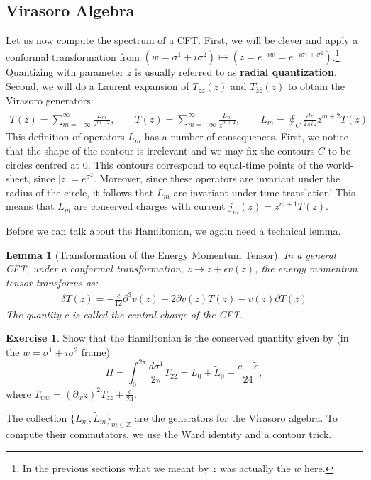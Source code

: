 \documentclass{report}
\theoremstyle{plain}
\newtheorem{lemma}[theorem]{Lemma}
\theoremstyle{definition}
\newtheorem{exercise}{Exercise}[section]
\theoremstyle{remark}
\newcommand{\FR}[2]{\frac{#1}{#2}}
\newcommand{\sg}{\sigma}
\newcommand{\di}{\partial}
\newcommand{\bZ}{\mathbb{Z}}
\begin{document}
\subsection{Virasoro Algebra}
Let us now compute the spectrum of a CFT. First, we will be clever and
apply a conformal transformation from $(w=\sg^1+i\sg^2)\mapsto
(z=e^{-iw}=e^{-i\sg^1+\sg^2})$.\footnote{In the previous sections what we
meant by $z$ was actually the $w$ here.} Quantizing with parameter $z$ is
usually referred to as \textbf{radial quantization}. Second, we will do a
Laurent expansion of $T_{zz}(z)$ and $T_{\bar z\bar z}(\bar z)$ to obtain
the Virasoro generators:
\begin{align}
    T(z) = \sum_{m=-\infty}^\infty \FR{L_m}{z^{m+2}}, \qquad
    \tilde T(z) = \sum_{m=-\infty}^\infty \FR{\tilde L_m}{\bar z^{m+2}}, \qquad
    L_m  = \oint_C \FR{dz}{2\pi iz} z^{m+2} T(z)
    \label{Virasorodefinition}
\end{align}
This definition of operators $L_m$ has a number of consequences. First, we
notice that the shape of the contour is irrelevant and we may fix the
contours $C$ to be circles centred at $0$. This contours correspond to
equal-time points of the world-sheet, since $|z| = e^{\sg^2}$. Moreover,
since these operators are invariant under the radius of the circle, it
follows that $L_m$ are invariant under time translation! This means that 
$L_m$ are conserved charges with current $j_m(z) = z^{m+1} T(z)$.

Before we can talk about the Hamiltonian, we again need a technical lemma.
\begin{lemma}[Transformation of the Energy Momentum Tensor] In a general
CFT, under a conformal transformation, $z \to z+\epsilon v(z)$, the energy
momentum tensor transforms as:
\begin{align}
    \delta T(z) = -\FR{c}{12} \di^3 v(z) - 2\di v(z)T(z) - v(z)\di T(z)
    \label{centralchargedefinition}
\end{align}
The quantity $c$ is called the central charge of the CFT.
\end{lemma}

\begin{exercise} 
Show that the Hamiltonian is the conserved quantity given
by (in the $w = \sg^1+i\sg^2$ frame) \[ H = \int_0^{2\pi} \FR{d\sg^1}{2\pi}
T_{22} = L_0 + \tilde L_0 - \FR{c+\tilde c}{24},\] where $T_{ww} = (\di_w
z)^2 T_{zz} + \FR{c}{24}$.  
\end{exercise}

The collection $\{L_m,\tilde L_m\}_{m\in\bZ}$ are the generators for the
Virasoro algebra. To compute their commutators, we use the Ward identity
and a contour trick. 
\end{document}
